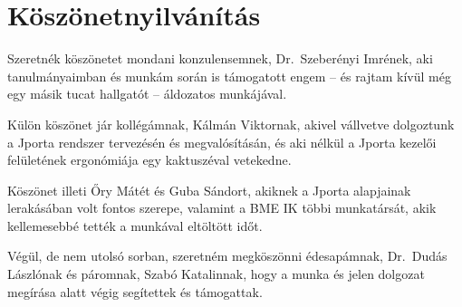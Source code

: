 \chapter*{Köszönetnyilvánítás}

Szeretnék köszönetet mondani konzulensemnek, Dr.~Szeberényi Imrének, aki tanulmányaimban és munkám során is támogatott engem -- és rajtam kívül még egy másik tucat hallgatót -- áldozatos munkájával.  

Külön köszönet jár kollégámnak, Kálmán Viktornak, akivel vállvetve dolgoztunk a Jporta rendszer tervezésén és megvalósításán, és aki nélkül a Jporta kezelői felületének ergonómiája egy kaktuszéval vetekedne.

Köszönet illeti Őry Mátét és Guba Sándort, akiknek a Jporta alapjainak lerakásában volt fontos szerepe, valamint a BME IK többi munkatársát, akik kellemesebbé tették a munkával eltöltött időt.

Végül, de nem utolsó sorban, szeretném megköszönni édesapámnak, Dr.~Dudás Lászlónak és páromnak, Szabó Katalinnak, hogy a munka és jelen dolgozat megírása alatt végig segítettek és támogattak. 